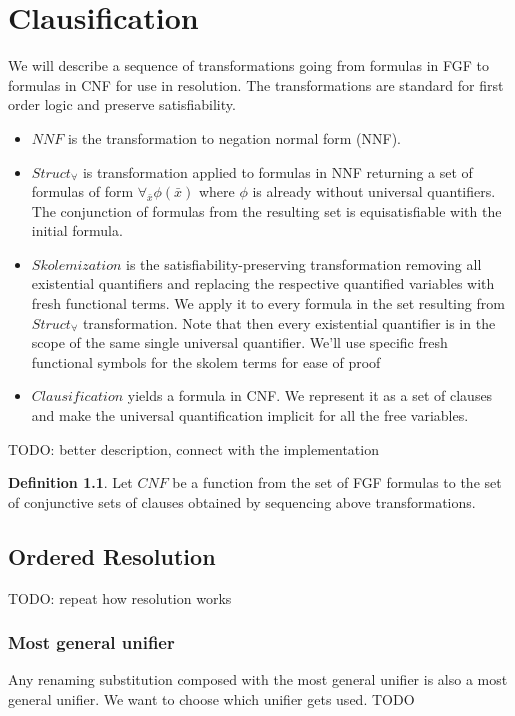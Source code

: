 \documentclass[english, shortabstract]{iithesis}
\theoremstyle{definition} \newtheorem{definition}{Definition}[chapter]
\theoremstyle{remark} \newtheorem{remark}[definition]{Observation}
\theoremstyle{plain} \newtheorem{theorem}[definition]{Theorem}
\theoremstyle{plain} \newtheorem{lemma}[definition]{Lemma}
\begin{document}
\chapter{Clausification}

We will describe a sequence of transformations going from formulas in FGF to formulas in CNF for use in resolution. 
The transformations are standard for first order logic and preserve satisfiability.
\begin{itemize}
    \item $NNF$ is the transformation to negation normal form (NNF).
    \item $Struct_{\forall}$ is transformation applied to formulas in NNF returning a set of formulas of form $\forall_{\bar{x}}\phi(\bar{x})$ where $\phi$ is already without universal quantifiers. The conjunction of formulas from the resulting set is equisatisfiable with the initial formula.
    \item $Skolemization$ is the satisfiability-preserving transformation removing all existential quantifiers and replacing the respective quantified variables with fresh functional terms.
    We apply it to every formula in the set resulting from $Struct_\forall$ transformation.
    Note that then every existential quantifier is in the scope of the same single universal quantifier.
    We'll use specific fresh functional symbols for the skolem terms for ease of proof
    \item $Clausification$ yields a formula in CNF. We represent it as a set of clauses and make the universal quantification implicit for all the free variables. 
\end{itemize}
TODO: better description, connect with the implementation
\begin{definition}
    Let $CNF$ be a function from the set of FGF formulas to the set of conjunctive sets of clauses obtained by sequencing above transformations.
\end{definition}

\section{Ordered Resolution}
TODO: repeat how resolution works

\subsection{Most general unifier}
Any renaming substitution composed with the most general unifier is also a most general unifier.
We want to choose which unifier gets used. TODO
\end{document}

